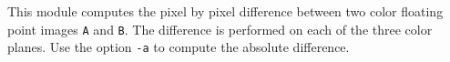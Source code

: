 This module computes the pixel by pixel difference between two color floating
point images \verb+A+ and \verb+B+.
The difference is performed on each of the three color planes.
Use the option \verb+-a+ to compute the absolute difference.
